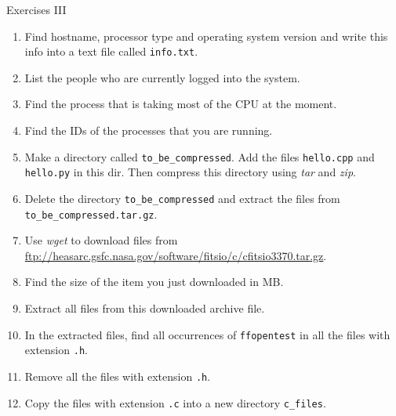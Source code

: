 \documentclass{beamer}
\begin{document}
\begin{frame}{Exercises III}
  \fontsize{8pt}{8}\selectfont
  \begin{enumerate}
    \item Find hostname, processor type and operating system version and write this info into a text file called \texttt{info.txt}.
    \item List the people who are currently logged into the system.
    \item Find the process that is taking most of the CPU at the moment.
    \item Find the IDs of the processes that you are running.
    \item Make a directory called \texttt{to\_be\_compressed}. Add the files \texttt{hello.cpp} and \texttt{hello.py} in this dir.
    Then compress this directory using \textit{tar} and \textit{zip}.
    \item Delete the directory \texttt{to\_be\_compressed} and extract the files from \texttt{to\_be\_compressed.tar.gz}.
    \item Use \textit{wget} to download files from \url{ftp://heasarc.gsfc.nasa.gov/software/fitsio/c/cfitsio3370.tar.gz}.
    \item Find the size of the item you just downloaded in MB.
    \item Extract all files from this downloaded archive file.
    \item In the extracted files, find all occurrences of \texttt{ffopentest} in all the files with extension \texttt{.h}.
    \item Remove all the files with extension \texttt{.h}.
    \item Copy the files with extension \texttt{.c} into a new directory \texttt{c\_files}.
  \end{enumerate}
\end{frame}
\end{document}
